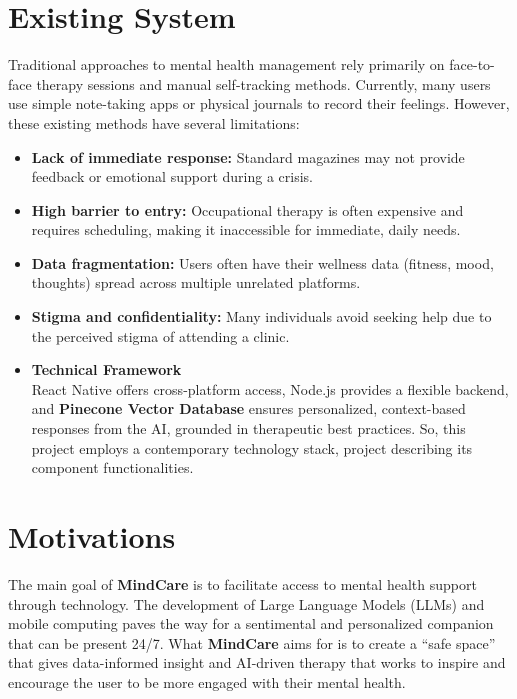 \documentclass[a4paper,12pt]{report}
\begin{document}
\section{Existing System}
Traditional approaches to mental health management rely primarily on face-to-face therapy sessions and manual self-tracking methods. Currently, many users use simple note-taking apps or physical journals to record their feelings. However, these existing methods have several limitations:
\begin{itemize}
    \item \textbf{Lack of immediate response:} Standard magazines may not provide feedback or emotional support during a crisis.
    \item \textbf{High barrier to entry:} Occupational therapy is often expensive and requires scheduling, making it inaccessible for immediate, daily needs.
    \item \textbf{Data fragmentation:} Users often have their wellness data (fitness, mood, thoughts) spread across multiple unrelated platforms.
    \item \textbf{Stigma and confidentiality:} Many individuals avoid seeking help due to the perceived stigma of attending a clinic.
\end{itemize}

\begin{itemize}
    \item \textbf{Technical Framework}\\
    React Native offers cross-platform access, Node.js provides a flexible backend, and \textbf{Pinecone Vector Database} ensures personalized, context-based responses from the AI, grounded in therapeutic best practices. So, this project employs a contemporary technology stack, project describing its component functionalities.
\end{itemize}

\section{Motivations}
The main goal of \textbf{MindCare} is to facilitate access to mental health support through technology. The development of Large Language Models (LLMs) and mobile computing paves the way for a sentimental and personalized companion that can be present 24/7. What \textbf{MindCare} aims for is to create a ``safe space'' that gives data-informed insight and AI-driven therapy that works to inspire and encourage the user to be more engaged with their mental health.
\end{document}
